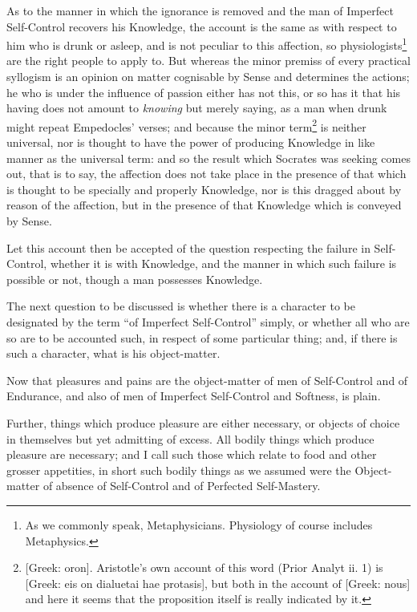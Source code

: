 As to the manner in which the ignorance is removed and the man of Imperfect
Self-Control recovers his Knowledge, the account is the same as with respect to
him who is drunk or asleep, and is not peculiar to this affection, so
physiologists\footnote{As we commonly speak, Metaphysicians. Physiology of course includes
Metaphysics.}
are the right people to apply to. But whereas the minor premiss of every
practical syllogism is an opinion on matter cognisable by Sense and determines
the actions; he who is under the influence of passion either has not this, or
so has it that his having does not amount to \emph{knowing} but merely saying,
as a man when drunk might repeat Empedocles’ verses; and because the
minor term\footnote{[Greek: oron]. Aristotle’s own account of this word (Prior Analyt ii. 1)
is [Greek: eis on dialuetai hae protasis], but both in the account of [Greek:
nous] and here it seems that the proposition itself is really indicated by it.}
is neither universal, nor is thought to have the power of producing Knowledge
in like manner as the universal term: and so the result which Socrates was
seeking comes out, that is to say, the affection does not take place in the
presence of that which is thought to be specially and properly Knowledge, nor
is this dragged about by reason of the affection, but in the presence of that
Knowledge which is conveyed by Sense.

Let this account then be accepted of the question respecting the failure in
Self-Control, whether it is with Knowledge, and the manner in which such
failure is possible or not, though a man possesses Knowledge.


The next question to be discussed is whether there is a character to be
designated by the term “of Imperfect Self-Control” simply, or
whether all who are so are to be accounted such, in respect of some particular
thing; and, if there is such a character, what is his object-matter.

Now that pleasures and pains are the object-matter of men of Self-Control and
of Endurance, and also of men of Imperfect Self-Control and Softness, is plain.

Further, things which produce pleasure are either necessary, or objects of
choice in themselves but yet admitting of excess. All bodily things which
produce pleasure are necessary; and I call such those which relate to food and
other grosser appetities, in short such bodily things as we assumed were the
Object-matter of absence of Self-Control and of Perfected Self-Mastery.

